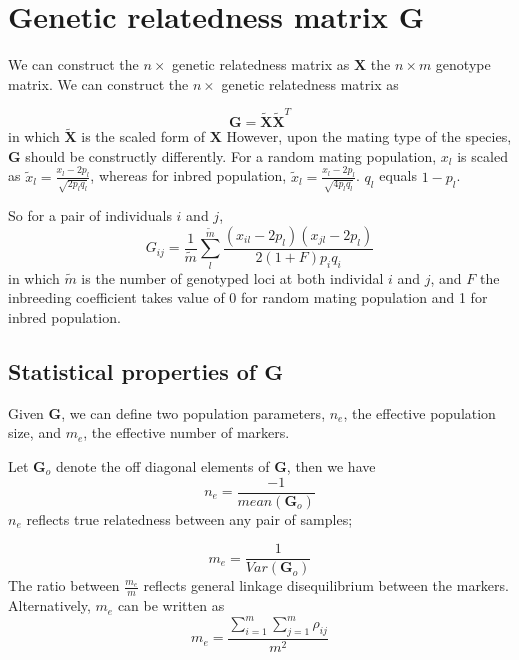 \documentclass[]{book}
\begin{document}
\hypertarget{genetic-relatedness-matrix-mathbfg}{%
\section{\texorpdfstring{Genetic relatedness matrix
\(\mathbf{G}\)}{Genetic relatedness matrix \textbackslash{}mathbf\{G\}}}\label{genetic-relatedness-matrix-mathbfg}}

We can construct the \(n\times\) genetic relatedness matrix as
\(\mathbf{X}\) the \(n\times m\) genotype matrix. We can construct the
\(n\times\) genetic relatedness matrix as

\[\mathbf{G}=\tilde{\mathbf{X}}\tilde{\mathbf{X}}^T\] in which
\(\tilde{\mathbf{X}}\) is the scaled form of \(\mathbf{X}\) However,
upon the mating type of the species, \(\mathbf{G}\) should be
constructly differently. For a random mating population, \(x_l\) is
scaled as \(\tilde{x}_l=\frac{x_l-2p_l}{\sqrt{2p_lq_l}}\), whereas for
inbred population, \(\tilde{x}_l=\frac{x_l-2p_l}{\sqrt{4p_lq_l}}\).
\(q_l\) equals \(1-p_l\).

So for a pair of individuals \(i\) and \(j\),
\[G_{ij}=\frac{1}{\tilde{m}}\sum_l^{\tilde{m}}\frac{(x_{il}-2p_l)(x_{jl}-2p_l)}{2(1+F)p_iq_i}\]
in which \(\tilde{m}\) is the number of genotyped loci at both individal
\(i\) and \(j\), and \(F\) the inbreeding coefficient takes value of 0
for random mating population and 1 for inbred population.

\hypertarget{statistical-properties-of-mathbfg}{%
\subsection{\texorpdfstring{Statistical properties of
\(\mathbf{G}\)}{Statistical properties of \textbackslash{}mathbf\{G\}}}\label{statistical-properties-of-mathbfg}}

Given \(\mathbf{G}\), we can define two population parameters, \(n_e\),
the effective population size, and \(m_e\), the effective number of
markers.

Let \(\mathbf{G}_o\) denote the off diagonal elements of \(\mathbf{G}\),
then we have \[n_e=\frac{-1}{mean(\mathbf{G}_o)}\] \(n_e\) reflects true
relatedness between any pair of samples;

\[m_e=\frac{1}{Var(\mathbf{G}_o)}\] The ratio between \(\frac{m_e}{m}\)
reflects general linkage disequilibrium between the markers.
Alternatively, \(m_e\) can be written as
\[m_e=\frac{\sum_{i=1}^m\sum_{j=1}^m\rho_{ij}}{m^2}\]
\end{document}
